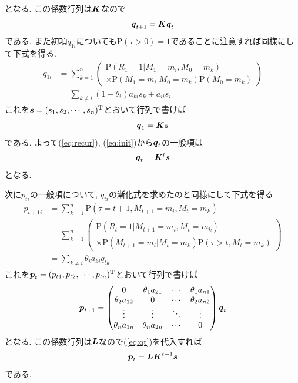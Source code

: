 となる. この係数行列は$ \boldsymbol{K} $なので
\begin{equation} \label{eq:recur}
    \boldsymbol{q}_{t + 1} = \boldsymbol{K} \boldsymbol{q}_t
\end{equation}
である. また初項$ q_{1 i} $についても$ \mathrm{P}(\tau > 0) = 1 $であることに注意すれば同様にして下式を得る. 
\begin{align}
    q_{1 i} & =\sum_{k=1}^n \left(
        \begin{array}{l}
            \mathrm{P}(R_1 = 1 | M_1 = m_i , M_0 = m_k) \\
            \times \mathrm{P}(M_1 = m_i | M_0 = m_k) \mathrm{P}(M_0 = m_k)
        \end{array}
    \right) \\
    & =\sum_{k \ne i} (1 - \theta_i) a_{k i} s_k + a_{i i} s_i
\end{align}
これを$ \boldsymbol{s} = (s_1 , s_2 , \cdots , s_n)^\mathrm{T} $とおいて行列で書けば
\begin{equation} \label{eq:init}
    \boldsymbol{q}_1 = \boldsymbol{K} \boldsymbol{s}
\end{equation}
である. よって(\ref{eq:recur}), (\ref{eq:init})から$ \boldsymbol{q}_t $の一般項は
\begin{equation} \label{eq:qt}
    \boldsymbol{q}_t = \boldsymbol{K}^t \boldsymbol{s}
\end{equation}
となる. 

次に$ p_{t i} $の一般項について, $ q_{t i} $の漸化式を求めたのと同様にして下式を得る. 
\begin{align}
    p_{t+1 i} & =\sum_{k=1}^n \mathrm{P}(\tau = t + 1 , M_{t+1} = m_i , M_t = m_k) \\
    & =\sum_{k=1}^n \left(
        \begin{array}{l}
            \mathrm{P}(R_t=1 | M_{t+1}=m_i , M_t=m_k) \\
            \times \mathrm{P}(M_{t+1}=m_i | M_t=m_k) \mathrm{P}(\tau>t , M_t=m_k)
        \end{array}
    \right) \\
    & =\sum_{k \ne i} \theta_i a_{k i} q_{t k} \label{eq:pti_rec}
\end{align}
これを$ \boldsymbol{p}_t = (p_{t 1} , p_{t 2} , \cdots , p_{t n})^\mathrm{T} $とおいて行列で書けば
\begin{equation}
    \boldsymbol{p}_{t + 1} = 
    \begin{pmatrix}
        0 & \theta_1 a_{2 1} & \cdots & \theta_1 a_{n 1} \\
        \theta_2 a_{1 2} & 0 & \cdots & \theta_2 a_{n 2} \\
        \vdots & \vdots & \ddots & \vdots \\
        \theta_n a_{1 n} & \theta_n a_{2 n} & \cdots & 0 \\
    \end{pmatrix}
    \boldsymbol{q}_t
\end{equation}
となる. この係数行列は$ \boldsymbol{L} $なので(\ref{eq:qt})を代入すれば
\begin{equation} \label{eq:pt}
    \boldsymbol{p}_t = \boldsymbol{L} \boldsymbol{K}^{t - 1} \boldsymbol{s}
\end{equation}
である. 

